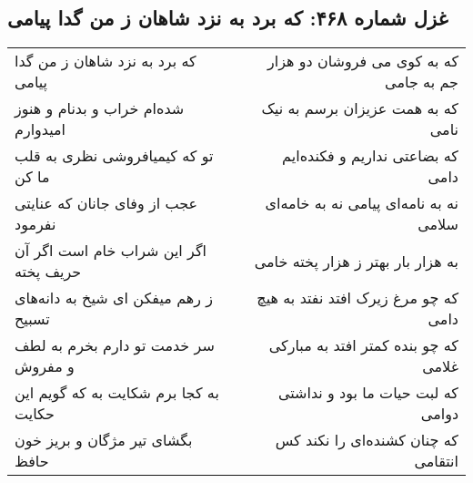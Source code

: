 \begin{center}
\section*{غزل شماره ۴۶۸: که برد به نزد شاهان ز من گدا پیامی}
\label{sec:sh468}
\begin{longtable}{l p{0.5cm} r}
که برد به نزد شاهان ز من گدا پیامی
&&
که به کوی می فروشان دو هزار جم به جامی
\\
شده‌ام خراب و بدنام و هنوز امیدوارم
&&
که به همت عزیزان برسم به نیک نامی
\\
تو که کیمیافروشی نظری به قلب ما کن
&&
که بضاعتی نداریم و فکنده‌ایم دامی
\\
عجب از وفای جانان که عنایتی نفرمود
&&
نه به نامه‌ای پیامی نه به خامه‌ای سلامی
\\
اگر این شراب خام است اگر آن حریف پخته
&&
به هزار بار بهتر ز هزار پخته خامی
\\
ز رهم میفکن ای شیخ به دانه‌های تسبیح
&&
که چو مرغ زیرک افتد نفتد به هیچ دامی
\\
سر خدمت تو دارم بخرم به لطف و مفروش
&&
که چو بنده کمتر افتد به مبارکی غلامی
\\
به کجا برم شکایت به که گویم این حکایت
&&
که لبت حیات ما بود و نداشتی دوامی
\\
بگشای تیر مژگان و بریز خون حافظ
&&
که چنان کشنده‌ای را نکند کس انتقامی
\\
\end{longtable}
\end{center}
